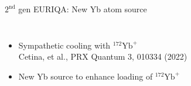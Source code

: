 \documentclass{beamer}
\begin{document}


\begin{frame}{$2^{\text{nd}}$ gen EURIQA: New Yb atom source}
  \begin{center}
    \begin{columns}
      \column{6.3cm}
      \begin{itemize}
      \item Sympathetic cooling with $^{172}\mathrm{Yb}^+$\\
        {\scriptsize Cetina, et al., PRX Quantum 3, 010334 (2022)}\\
        \vspace{1em}
      \item<2-> New Yb source to enhance loading of $^{172}\mathrm{Yb}^+$
      \end{itemize}
      \column{5.1cm}
    \end{columns}
  \end{center}
\end{frame}

\end{document}
